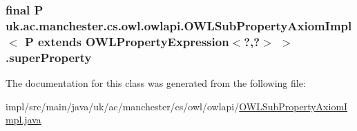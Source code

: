 \hypertarget{classuk_1_1ac_1_1manchester_1_1cs_1_1owl_1_1owlapi_1_1_o_w_l_sub_property_axiom_impl_3_01_p_01ex22572232b03223b699ed74a4771c1e6d_a81fd31047eeab5c2f30bb015b090217c}{
\subsubsection[{super\-Property}]{\setlength{\rightskip}{0pt plus 5cm}final P uk.\-ac.\-manchester.\-cs.\-owl.\-owlapi.\-O\-W\-L\-Sub\-Property\-Axiom\-Impl$<$ P extends O\-W\-L\-Property\-Expression$<$?,?$>$ $>$.super\-Property\hspace{0.3cm}{\ttfamily [private]}}}\label{classuk_1_1ac_1_1manchester_1_1cs_1_1owl_1_1owlapi_1_1_o_w_l_sub_property_axiom_impl_3_01_p_01ex22572232b03223b699ed74a4771c1e6d_a81fd31047eeab5c2f30bb015b090217c}


The documentation for this class was generated from the following file\-:\begin{DoxyCompactItemize}
\item 
impl/src/main/java/uk/ac/manchester/cs/owl/owlapi/\hyperlink{_o_w_l_sub_property_axiom_impl_8java}{O\-W\-L\-Sub\-Property\-Axiom\-Impl.\-java}\end{DoxyCompactItemize}
